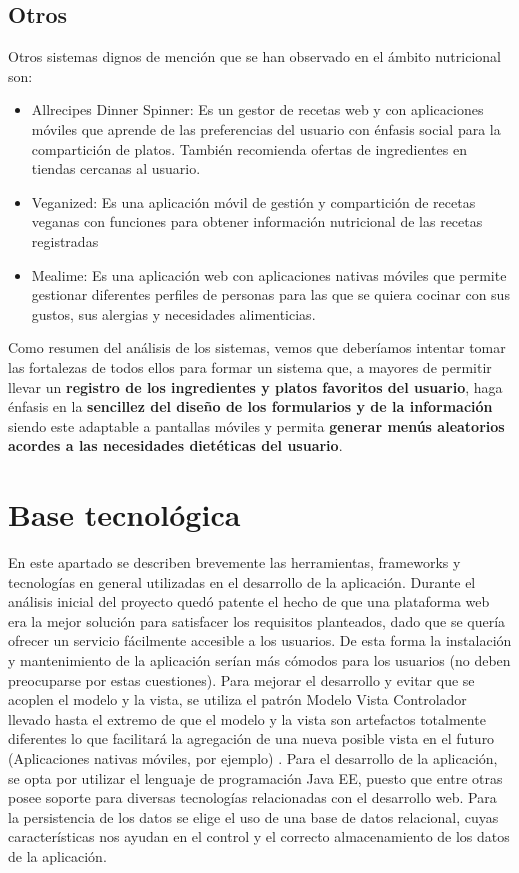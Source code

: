 \documentclass[12pt, a4paper, twoside]{book}
\begin{document}
	\section{Otros}
	Otros sistemas dignos de mención que se han observado en el ámbito nutricional son:
	\begin{itemize}
		\item Allrecipes Dinner Spinner: Es un gestor de recetas web y con aplicaciones móviles que aprende de las preferencias del usuario con énfasis social para la compartición de platos. También recomienda ofertas de ingredientes en tiendas cercanas al usuario.
		\item Veganized: Es una aplicación móvil de gestión y compartición de recetas veganas con funciones para obtener información nutricional de las recetas registradas
		\item Mealime: Es una aplicación web con aplicaciones nativas móviles que permite gestionar diferentes perfiles de personas para las que se quiera cocinar con sus gustos, sus alergias y necesidades alimenticias.
	\end{itemize}
	
	Como resumen del análisis de los sistemas, vemos que deberíamos intentar tomar las fortalezas de todos ellos para formar un sistema que, a mayores de permitir llevar un \textbf{registro de los ingredientes y platos favoritos del usuario}, haga énfasis en la \textbf{sencillez del diseño de los formularios y de la información} siendo este adaptable a pantallas móviles y permita \textbf{generar menús aleatorios acordes a las necesidades dietéticas del usuario}.
	
	\chapter{Base tecnológica}
	En este apartado se describen brevemente las herramientas, frameworks y tecnologías en general utilizadas en el desarrollo de la aplicación. Durante el análisis inicial del proyecto quedó patente el hecho de que una plataforma web era la mejor solución para satisfacer los requisitos planteados, dado que se quería ofrecer un servicio fácilmente accesible a los usuarios. De esta forma la instalación y mantenimiento de la aplicación serían más cómodos para los usuarios (no deben preocuparse por estas cuestiones). Para mejorar el desarrollo y evitar que se acoplen el modelo y la vista, se utiliza el patrón Modelo Vista Controlador llevado hasta el extremo de que el modelo y la vista son artefactos totalmente diferentes lo que facilitará la agregación de una nueva posible vista en el futuro (Aplicaciones nativas móviles, por ejemplo) .
	Para el desarrollo de la aplicación, se opta por utilizar el lenguaje de programación Java EE, puesto que entre otras posee soporte para diversas tecnologías relacionadas con el desarrollo web.
	Para la persistencia de los datos se elige el uso de una base de datos relacional, cuyas características nos ayudan en el control y el correcto almacenamiento de los datos de la aplicación.	
\end{document}

